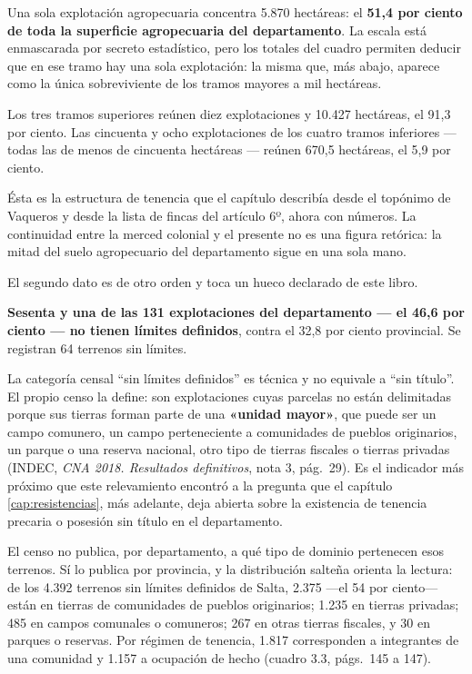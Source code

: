 Una sola explotación agropecuaria concentra 5.870 hectáreas: el \textbf{51,4 por ciento de toda la superficie agropecuaria del departamento}. La escala está enmascarada por secreto estadístico, pero los totales del cuadro permiten deducir que en ese tramo hay una sola explotación: la misma que, más abajo, aparece como la única sobreviviente de los tramos mayores a mil hectáreas.

Los tres tramos superiores reúnen diez explotaciones y 10.427 hectáreas, el 91,3 por ciento. Las cincuenta y ocho explotaciones de los cuatro tramos inferiores --- todas las de menos de cincuenta hectáreas --- reúnen 670,5 hectáreas, el 5,9 por ciento.

Ésta es la estructura de tenencia que el capítulo describía desde el topónimo de Vaqueros y desde la lista de fincas del artículo 6º, ahora con números. La continuidad entre la merced colonial y el presente no es una figura retórica: la mitad del suelo agropecuario del departamento sigue en una sola mano.

El segundo dato es de otro orden y toca un hueco declarado de este libro.

\textbf{Sesenta y una de las 131 explotaciones del departamento --- el 46,6 por ciento --- no tienen límites definidos}, contra el 32,8 por ciento provincial. Se registran 64 terrenos sin límites.

La categoría censal ``sin límites definidos'' es técnica y no equivale a ``sin título''. El propio censo la define: son explotaciones cuyas parcelas no están delimitadas porque sus tierras forman parte de una \textbf{«unidad mayor»}, que puede ser un campo comunero, un campo perteneciente a comunidades de pueblos originarios, un parque o una reserva nacional, otro tipo de tierras fiscales o tierras privadas (INDEC, \textit{CNA 2018. Resultados definitivos}, nota 3, pág.\ 29). Es el indicador más próximo que este relevamiento encontró a la pregunta que el capítulo \ref{cap:resistencias}, más adelante, deja abierta sobre la existencia de tenencia precaria o posesión sin título en el departamento.

El censo no publica, por departamento, a qué tipo de dominio pertenecen esos terrenos. Sí lo publica por provincia, y la distribución salteña orienta la lectura: de los 4.392 terrenos sin límites definidos de Salta, 2.375 ---el 54 por ciento--- están en tierras de comunidades de pueblos originarios; 1.235 en tierras privadas; 485 en campos comunales o comuneros; 267 en otras tierras fiscales, y 30 en parques o reservas. Por régimen de tenencia, 1.817 corresponden a integrantes de una comunidad y 1.157 a ocupación de hecho (cuadro 3.3, págs.\ 145 a 147).

